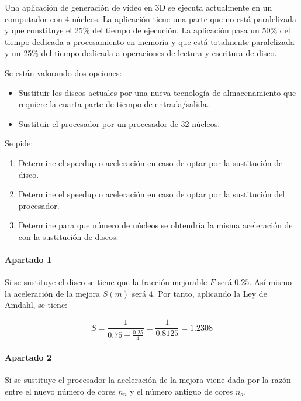 \begin{acexercise}\end{acexercise}

Una aplicación de generación de vídeo en 3D se ejecuta actualmente en un
computador con 4 núcleos. La aplicación tiene una parte que no está
paralelizada y que constituye el 25\% del tiempo de ejecución. La aplicación
pasa un 50\% del tiempo dedicada a procesamiento en memoria y que está
totalmente paralelizada y un 25\% del tiempo dedicada a operaciones de lectura
y escritura de disco.

Se están valorando dos opciones:

\begin{itemize}
\item Sustituir los discos actuales por una nueva tecnología de almacenamiento que requiere la cuarta parte de tiempo de entrada/salida.
\item Sustituir el procesador por un procesador de 32 núcleos.
\end{itemize}

Se pide:

\begin{enumerate}
\item Determine el speedup o aceleración en caso de optar por la sustitución de disco.
\item Determine el speedup o aceleración en caso de optar por la sustitución del procesador.
\item Determine para que número de núcleos se obtendría la misma aceleración de con la sustitución de discos.
\end{enumerate}


\begin{acsolution}\end{acsolution}

\paragraph{Apartado 1}
Si se sustituye el disco se tiene que la fracción mejorable $F$ será $0.25$. Así
mismo la aceleración de la mejora $S(m)$ será $4$. Por tanto, aplicando la Ley de
Amdahl, se tiene:

\[
S = \frac{1}{0.75 + \frac{0.25}{4}} = \frac{1}{0.8125} =  1.2308
\]

\paragraph{Apartado 2}
Si se sustituye el procesador la aceleración de la mejora viene dada por la
razón entre el nuevo número de cores $n_n$ y el número antiguo de cores $n_a$.

